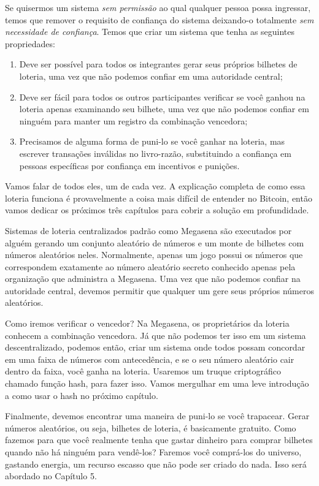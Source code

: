 Se quisermos um sistema \textit{sem permissão} ao qual qualquer pessoa possa ingressar, temos que remover o requisito de confiança do sistema deixando-o totalmente \textit{sem necessidade de confiança}. Temos que criar um sistema que tenha as seguintes propriedades:

\begin{samepage}
\begin{enumerate}
\item Deve ser possível para todos os integrantes gerar seus próprios bilhetes de loteria, uma vez que não podemos confiar em uma autoridade central;
\item Deve ser fácil para todos os outros participantes verificar se você ganhou na loteria apenas examinando seu bilhete, uma vez que não podemos confiar em ninguém para manter um registro da combinação vencedora;
\item Precisamos de alguma forma de puni-lo se você ganhar na loteria, mas escrever transações inválidas no livro-razão, substituindo a confiança em pessoas específicas por confiança em incentivos e punições.
\end{enumerate}
\end{samepage}

Vamos falar de todos eles, um de cada vez. A explicação completa de como essa loteria funciona é provavelmente a coisa mais difícil de entender no Bitcoin, então vamos dedicar os próximos três capítulos para cobrir a solução em profundidade.

Sistemas de loteria centralizados padrão como Megasena são executados por alguém gerando um conjunto aleatório de números e um monte de bilhetes com números aleatórios neles. Normalmente, apenas um jogo possui os números que correspondem exatamente ao número aleatório secreto conhecido apenas pela organização que administra a Megasena. Uma vez que não podemos confiar na autoridade central, devemos permitir que qualquer um gere seus próprios números aleatórios.

Como iremos verificar o vencedor? Na Megasena, os proprietários da loteria conhecem a combinação vencedora. Já que não podemos ter isso em um sistema descentralizado, podemos então, criar um sistema onde todos possam concordar em uma faixa de números com antecedência, e se o seu número aleatório cair dentro da faixa, você ganha na loteria. Usaremos um truque criptográfico chamado função hash, para fazer isso. Vamos mergulhar em uma leve introdução a como usar o hash no próximo capítulo.

Finalmente, devemos encontrar uma maneira de puni-lo se você trapacear. Gerar números aleatórios, ou seja, bilhetes de loteria, é basicamente gratuito. Como fazemos para que você realmente tenha que gastar dinheiro para comprar bilhetes quando não há ninguém para vendê-los? Faremos você comprá-los do universo, gastando energia, um recurso escasso que não pode ser criado do nada. Isso será abordado no Capítulo 5.

